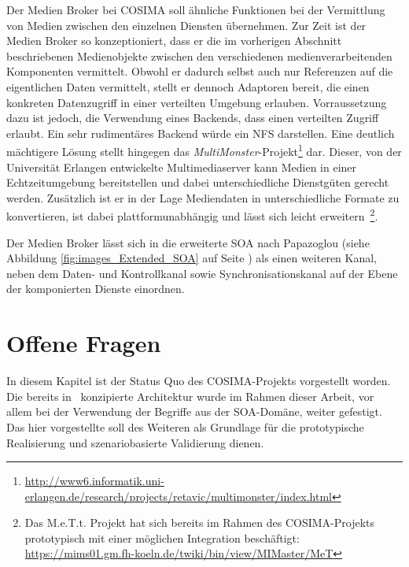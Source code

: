   Der Medien Broker bei COSIMA soll ähnliche Funktionen bei der Vermittlung von Medien zwischen den einzelnen Diensten übernehmen. Zur Zeit ist der Medien Broker so konzeptioniert, dass er die im vorherigen Abschnitt beschriebenen Medienobjekte zwischen den verschiedenen medienverarbeitenden Komponenten vermittelt. Obwohl er dadurch selbst auch nur Referenzen auf die eigentlichen Daten vermittelt, stellt er dennoch Adaptoren bereit, die einen konkreten Datenzugriff in einer verteilten Umgebung erlauben. Vorraussetzung dazu ist jedoch, die Verwendung eines Backends, dass einen verteilten Zugriff erlaubt. Ein sehr rudimentäres Backend würde ein NFS darstellen. Eine deutlich mächtigere Lösung stellt hingegen das \emph{MultiMonster}-Projekt\footnote{\url{http://www6.informatik.uni-erlangen.de/research/projects/retavic/multimonster/index.html}} dar. Dieser, von der Universität Erlangen entwickelte Multimediaserver kann Medien in einer Echtzeitumgebung bereitstellen und dabei unterschiedliche Dienstgüten gerecht werden. Zusätzlich ist er in der Lage Mediendaten in unterschiedliche Formate zu konvertieren, ist dabei plattformunabhängig und lässt sich leicht erweitern~\citep{suchomski2004oar}\footnote{Das M.e.T.t. Projekt hat sich bereits im Rahmen des COSIMA-Projekts prototypisch mit einer möglichen Integration beschäftigt: \url{https://mims01.gm.fh-koeln.de/twiki/bin/view/MIMaster/MeT}}.
  
  Der Medien Broker lässt sich in die erweiterte SOA nach Papazoglou (siehe Abbildung \ref{fig:images_Extended_SOA} auf Seite \pageref{fig:images_Extended_SOA}) als einen weiteren Kanal, neben dem Daten- und Kontrollkanal sowie Synchronisationskanal auf der Ebene der komponierten Dienste einordnen.
  


\section{Offene Fragen} %
\label{sec:offene_fragen}

  In diesem Kapitel ist der Status Quo des COSIMA-Projekts vorgestellt worden. Die bereits in~\citep{bericht} konzipierte Architektur wurde im Rahmen dieser Arbeit, vor allem bei der Verwendung der Begriffe aus der SOA-Domäne, weiter gefestigt. Das hier vorgestellte soll des Weiteren als Grundlage für die prototypische Realisierung und szenariobasierte Validierung dienen.

